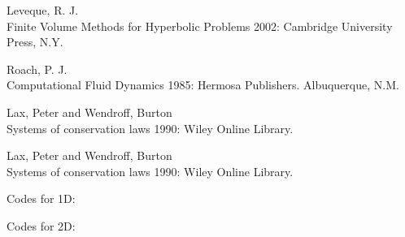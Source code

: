 




\begin{thebibliography}{1}

  Leveque, R. J. {\\Finite Volume Methods for Hyperbolic Problems} 2002:
Cambridge University Press, N.Y.

 Roach, P. J. {\\Computational Fluid Dynamics} 1985: Hermosa Publishers. Albuquerque, N.M.

 Lax, Peter and Wendroff, Burton {\\Systems of conservation laws} 1990: Wiley Online Library.

 Lax, Peter and Wendroff, Burton {\\Systems of conservation laws} 1990: Wiley Online Library.


\end{thebibliography}


\newpage
Codes for 1D:

Codes for 2D:
